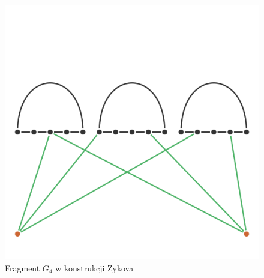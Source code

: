 \begin{figure}[H]
	\centering
	\includegraphics[scale=0.5]{images/zykov_graph.png}
	\caption{Fragment $G_4$ w konstrukcji Zykova}
\end{figure}

